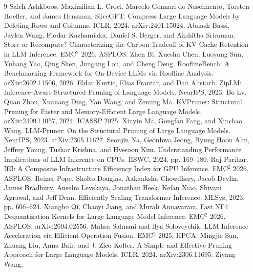 \documentclass[10pt,letterpaper,twocolumn]{article}
\begin{document}

\begin{thebibliography}{9}\small
{} Saleh Ashkboos,
Maximilian L. Croci, Marcelo Gennari do Nascimento, Torsten
Hoefler, and James Hensman. SliceGPT: Compress Large Language
Models by Deleting Rows and Columns. ICLR, 2024.
arXiv:2401.15024.
 Abnash Bassi, Jaylen Wang,
Fiodar Kazhamiaka, Daniel S. Berger, and Akshitha Sriraman.
Store or Recompute? Characterizing the Carbon Tradeoff of KV
Cache Retention in LLM Inference. EMC$^2$ 2026, ASPLOS.
 Zhen Bi, Xueshu Chen,
Luoyang Sun, Yuhang Yao, Qing Shen, Jungang Lou, and Cheng Deng.
RooflineBench: A
Benchmarking Framework for On-Device LLMs via Roofline Analysis.
arXiv:2602.11506, 2026.
 Eldar Kurtic, Elias
Frantar, and Dan Alistarh. ZipLM: Inference-Aware
Structured Pruning of Language Models. NeurIPS, 2023.
 Bo Lv, Quan Zhou, Xuanang
Ding, Yan Wang, and Zeming Ma. KVPruner: Structural
Pruning for Faster and Memory-Efficient Large Language Models.
arXiv:2409.11057, 2024; ICASSP 2025.
 Xinyin Ma, Gongfan Fang,
and Xinchao Wang. LLM-Pruner: On the Structural Pruning of Large
Language Models. NeurIPS, 2023. arXiv:2305.11627.
 Seonjin Na, Geonhwa Jeong,
Byung Hoon Ahn, Jeffrey Young, Tushar Krishna, and Hyesoon Kim.
Understanding Performance Implications of LLM Inference on CPUs.
IISWC, 2024, pp. 169--180.
 Raj Parihar. IEI: A Composite
Infrastructure Efficiency Index for GPU Inference. EMC$^2$ 2026,
ASPLOS.
 Reiner Pope, Sholto Douglas,
Aakanksha Chowdhery, Jacob Devlin, James Bradbury, Anselm
Levskaya, Jonathan Heek, Kefan Xiao, Shivani Agrawal, and Jeff
Dean. Efficiently Scaling Transformer Inference. MLSys, 2023,
pp. 606--624.
 Xiangbo Qi, Chaoyi Jiang, and
Murali Annavaram. Fast NF4 Dequantization Kernels for Large
Language Model Inference. EMC$^2$ 2026, ASPLOS.
arXiv:2604.02556.
 Mahsa Salmani
and Ilya Soloveychik. LLM Inference Acceleration via Efficient
Operation Fusion. EMC$^2$ 2025, HPCA.
 Mingjie Sun, Zhuang Liu,
Anna Bair, and J. Zico Kolter. A Simple and Effective Pruning
Approach for Large Language Models. ICLR, 2024.
arXiv:2306.11695.
 Ziyang Wang,

\end{thebibliography}
\end{document}
